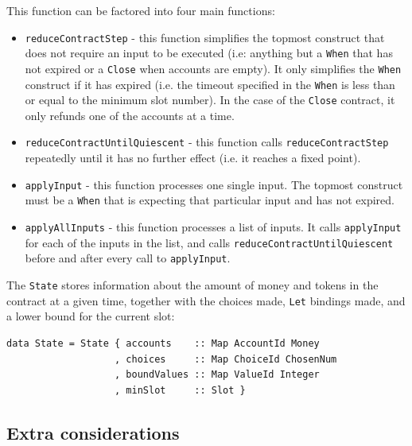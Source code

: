 \documentclass[english,runningheads]{llncs}
\begin{document}
This function can be factored into four main functions:
\begin{itemize}
\item \texttt{reduceContractStep} - this function simplifies the topmost
construct that does not require an input to be executed (i.e: anything
but a \texttt{When} that has not expired or a \texttt{Close} when
accounts are empty). It only simplifies the \texttt{When} construct
if it has expired (i.e. the timeout specified in the \texttt{When}
is less than or equal to the minimum slot number). In the case of
the \texttt{Close} contract, it only refunds one of the accounts at
a time. 
\item \texttt{reduceContractUntilQuiescent} - this function calls \texttt{reduceContractStep}
repeatedly until it has no further effect (i.e. it reaches a fixed
point). 
\item \texttt{applyInput} - this function processes one single input.
The topmost construct must be a \texttt{When} that
is expecting that particular input and has not expired. 
\item \texttt{applyAllInputs} - this function processes a list of inputs.
It calls \texttt{applyInput} for each of the inputs in the list, and
calls \texttt{reduceContractUntilQuiescent} before and after every
call to \texttt{applyInput}.
\end{itemize}
The \texttt{State} stores information about the amount of money and
tokens in the contract at a given time, together with the choices
made, \texttt{Let} bindings made, and a lower bound for the current
slot:

\begin{verbatim}
data State = State { accounts    :: Map AccountId Money
                   , choices     :: Map ChoiceId ChosenNum
                   , boundValues :: Map ValueId Integer
                   , minSlot     :: Slot }
\end{verbatim}

\subsection{Extra considerations\label{subsec:Extra-considerations}}
\end{document}
